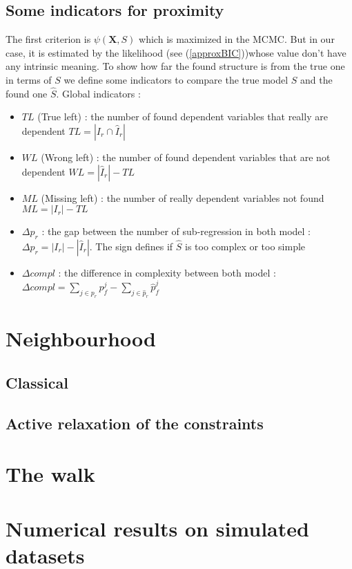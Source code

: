 \documentclass[12pt,a4paper]{report}
\begin{document}
%	 
%	
		\subsection{Some indicators for proximity}
		The first criterion is $\psi(\boldsymbol{X},S)$ which is maximized in the MCMC. But in our case, it is estimated by the likelihood (see (\ref{approxBIC}))whose value don't have any intrinsic meaning. To show how far the found structure is from the true one in terms of $S$ we define some indicators to compare the true model $S$ and the found one $\hat{S}$.
			Global indicators :
			\begin{itemize}
				\item $TL$ (True left) : the number of found dependent variables that really are dependent $TL=|I_r\cap \hat{I}_r|$ 
				\item $WL$ (Wrong left) : the number of found dependent variables that are not dependent $WL=|\hat{I}_r|-TL$
				\item $ML$ (Missing left) : the number of really dependent variables not found $ML=|I_r|-TL$
				\item $\Delta p_r$ : the gap between the number of sub-regression in both model : $\Delta p_r=|I_r|-|\hat{I}_r|$. The sign defines if $\hat{S}$ is too complex or too simple
				\item $\Delta compl$ : the difference in complexity between both model : $\Delta compl=\sum_{j \in p_r}p_f^j-\sum_{j \in \hat{p}_r}\hat{p}_f^j$
			\end{itemize}
	\section{Neighbourhood}
		\subsection{Classical}
		\subsection{Active relaxation of the constraints}
	\section{The walk}
	
	\section{Numerical results on simulated datasets} \label{sectionsimul}
\end{document}
